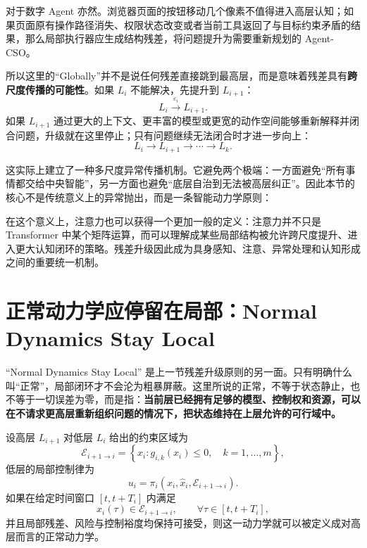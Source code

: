 对于数字 Agent 亦然。浏览器页面的按钮移动几个像素不值得进入高层认知；如果页面原有操作路径消失、权限状态改变或者当前工具返回了与目标约束矛盾的结果，那么局部执行器应生成结构残差，将问题提升为需要重新规划的 Agent-CSO。

所以这里的``Globally''并不是说任何残差直接跳到最高层，而是意味着残差具有\textbf{跨尺度传播的可能性}。如果 $L_i$ 不能解决，先提升到 $L_{i+1}$：
\begin{equation}
L_i
\xrightarrow{\varepsilon_i}
L_{i+1}.
\end{equation}
如果 $L_{i+1}$ 通过更大的上下文、更丰富的模型或更宽的动作空间能够重新解释并闭合问题，升级就在这里停止；只有问题继续无法闭合时才进一步向上：
\begin{equation}
L_i
\to
L_{i+1}
\to
\cdots
\to
L_k.
\end{equation}

这实际上建立了一种多尺度异常传播机制。它避免两个极端：一方面避免``所有事情都交给中央智能''，另一方面也避免``底层自治到无法被高层纠正''。因此本节的核心不是传统意义上的异常抛出，而是一条智能动力学原则：
\begin{statementbox}
\centering
{}
\end{statementbox}

在这个意义上，注意力也可以获得一个更加一般的定义：注意力并不只是 Transformer 中某个矩阵运算，而可以理解成某些局部结构被允许跨尺度提升、进入更大认知闭环的策略。残差升级因此成为具身感知、注意、异常处理和认知形成之间的重要统一机制。

\section{正常动力学应停留在局部：Normal Dynamics Stay Local}

``Normal Dynamics Stay Local'' 是上一节残差升级原则的另一面。只有明确什么叫``正常''，局部闭环才不会沦为粗暴屏蔽。这里所说的正常，不等于状态静止，也不等于一切误差为零，而是指：\textbf{当前层已经拥有足够的模型、控制权和资源，可以在不请求更高层重新组织问题的情况下，把状态维持在上层允许的可行域中。}

设高层 $L_{i+1}$ 对低层 $L_i$ 给出的约束区域为
\begin{equation}
\mathcal{E}_{i+1\to i}
=
\left\{
x_i:
g_{i,k}(x_i)\leq 0,\quad
k=1,\ldots,m
\right\},
\end{equation}
低层的局部控制律为
\begin{equation}
u_i
=
\pi_i
\left(
x_i,
\hat{x}_i,
\mathcal{E}_{i+1\to i}
\right).
\end{equation}
如果在给定时间窗口 $[t,t+T_i]$ 内满足
\begin{equation}
x_i(\tau)\in \mathcal{E}_{i+1\to i},
\qquad
\forall \tau\in[t,t+T_i],
\end{equation}
并且局部残差、风险与控制裕度均保持可接受，则这一动力学就可以被定义成对高层而言的正常动力学。

